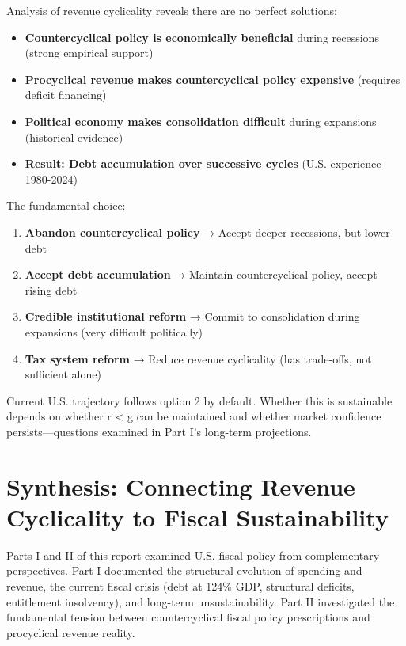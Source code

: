 \documentclass[12pt,letterpaper]{article}
\begin{document}
Analysis of revenue cyclicality reveals there are no perfect solutions:

\begin{itemize}
    \item \textbf{Countercyclical policy is economically beneficial} during recessions (strong empirical support)
    \item \textbf{Procyclical revenue makes countercyclical policy expensive} (requires deficit financing)
    \item \textbf{Political economy makes consolidation difficult} during expansions (historical evidence)
    \item \textbf{Result: Debt accumulation over successive cycles} (U.S. experience 1980-2024)
\end{itemize}

The fundamental choice:

\begin{enumerate}
    \item \textbf{Abandon countercyclical policy} → Accept deeper recessions, but lower debt
    \item \textbf{Accept debt accumulation} → Maintain countercyclical policy, accept rising debt
    \item \textbf{Credible institutional reform} → Commit to consolidation during expansions (very difficult politically)
    \item \textbf{Tax system reform} → Reduce revenue cyclicality (has trade-offs, not sufficient alone)
\end{enumerate}

Current U.S. trajectory follows option 2 by default. Whether this is sustainable depends on whether r < g can be maintained and whether market confidence persists—questions examined in Part I's long-term projections.

\newpage


\section{Synthesis: Connecting Revenue Cyclicality to Fiscal Sustainability}

Parts I and II of this report examined U.S. fiscal policy from complementary perspectives. Part I documented the structural evolution of spending and revenue, the current fiscal crisis (debt at 124\% GDP, structural deficits, entitlement insolvency), and long-term unsustainability. Part II investigated the fundamental tension between countercyclical fiscal policy prescriptions and procyclical revenue reality.
\end{document}
